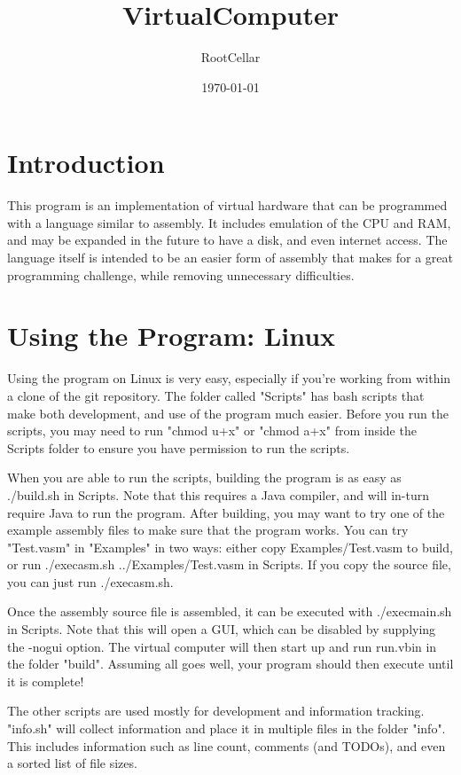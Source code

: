 \documentclass[12pt]{article}
\title{VirtualComputer}
\author{RootCellar}
\date{\today}
\begin{document}
\maketitle

\section{Introduction}

This program is an implementation of virtual hardware that can be programmed with a language similar to assembly.
It includes emulation of the CPU and RAM, and may be expanded in the future to have a disk, and even internet access.
The language itself is intended to be an easier form of assembly that makes for a great programming challenge, while
removing unnecessary difficulties.

\section{Using the Program: Linux}

Using the program on Linux is very easy, especially if you're working from within a clone of the git repository.
The folder called "Scripts" has bash scripts that make both development, and use of the program much easier.
Before you run the scripts, you may need to run "chmod u+x" or "chmod a+x" from inside the Scripts folder to
ensure you have permission to run the scripts.

When you are able to run the scripts, building the program is as easy as ./build.sh in Scripts. Note that this requires a Java compiler,
and will in-turn require Java to run the program. After building, you may want to try one of the example assembly
files to make sure that the program works. You can try "Test.vasm" in "Examples" in two ways: either copy Examples/Test.vasm to build, or
run ./execasm.sh ../Examples/Test.vasm in Scripts. If you copy the source file, you can just run ./execasm.sh.

Once the assembly source file is assembled, it can be executed with ./execmain.sh in Scripts. Note that this will open a GUI,
which can be disabled by supplying the -nogui option. The virtual computer will then start up and run run.vbin in the folder "build".
Assuming all goes well, your program should then execute until it is complete!

The other scripts are used mostly for development and information tracking. "info.sh" will collect information and place it
in multiple files in the folder "info". This includes information such as line count, comments (and TODOs), and even a sorted list of file sizes.
\end{document}
